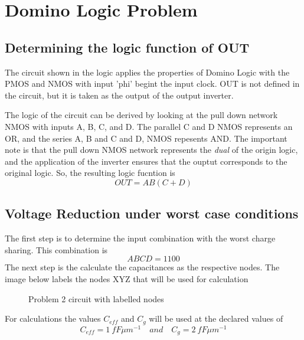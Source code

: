 \documentclass[12pt]{article}
\begin{document}
\pagebreak
\section{Domino Logic Problem}                              %
\subsection{Determining the logic function of OUT}
The circuit shown in the logic applies the properties of Domino Logic with the PMOS and NMOS with input 'phi' begint the input clock. OUT is not defined in the circuit, but it is taken as the output of the output inverter. 

The logic of the circuit can be derived by looking at the pull down network NMOS with inputs A, B, C, and D. The parallel C and D NMOS represents an OR, and the series A, B and C and D, NMOS repesents AND. The important note is that the pull down NMOS network represents the \textit{dual} of the origin logic, and the application of the inverter ensures that the ouptut corresponds to the original logic. So, the resulting logic fucntion is 
\[OUT = AB(C+D) \]
\subsection{Voltage Reduction under worst case conditions}
The first step is to determine the input combination with the worst charge sharing. This combination is 
\[ ABCD = 1100 \]
The next step is the calculate the capacitances as the respective nodes. The image below labels the nodes XYZ that will be used for calculation
\begin{figure} [H]
    \centering
    \caption{Problem 2 circuit with labelled nodes}
\end{figure}
For calculations the values $C_{eff}$ and $C_g$ will be used at the declared values of
\[C_{eff} = \SI{1}{fF \mu m^{-1}} \quad and \quad C_g = \SI{2}{fF \mu m^{-1}}\]
\end{document}
